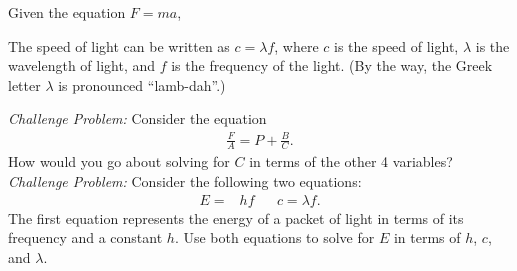 \begin{questions}
\question Given the equation $F=ma$,
\question
{}

\question The speed of light can be written as $c=\lambda f$, where $c$ is the speed of light, $\lambda$ is the wavelength of light, and $f$ is the frequency of the light. (By the way, the Greek letter $\lambda$ is pronounced ``lamb-dah''.)
\question \emph{Challenge Problem:} Consider the equation
\begin{align*}
\frac{F}{A} = P + \frac{B}{C}.
\end{align*}
How would you go about solving for $C$ in terms of the other 4 variables?
\qsppp
\question \emph{Challenge Problem:} Consider the following two equations:
\begin{align*}
E =& hf & & c = \lambda f. 
\end{align*}
The first equation represents the energy of a packet of light in terms of its frequency and a constant $h$. Use both equations to solve for $E$ in terms of $h$, $c$, and $\lambda$. 
\end{questions}

